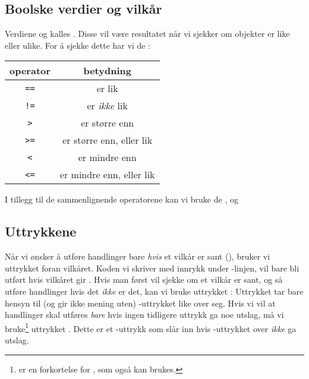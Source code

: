 \subsection{Boolske verdier og vilkår}
Verdiene  og  kalles . Disse vil være resultatet når vi sjekker om objekter er like eller ulike. For å sjekke dette har vi de :
\begin{center}
	\begin{tabular}{c|c}
		\textbf{operator} & \textbf{betydning} \\ \hline
		\texttt{==}	& er lik \\ \rowcolor{gray!10}
		\texttt{!=} & er \textsl{ikke} lik\\
		\texttt{>} & er større enn \\ \rowcolor{gray!10}
		\texttt{>=} & er større enn, eller lik \\
		\texttt{<} & er mindre enn \\ \rowcolor{gray!10}
		\texttt{<=} & er mindre enn, eller lik \\		
	\end{tabular}
\end{center}
\vsk

I tillegg til de sammenlignende operatorene kan vi bruke de  ,  og 
\subsection{Uttrykkene }
Når vi ønsker å utføre handlinger bare \textsl{hvis} et vilkår er sant (), bruker vi uttrykket  foran vilkåret. Koden vi skriver med innrykk under -linjen, vil bare bli utført hvis vilkåret gir . 
Hvis man først vil sjekke om et vilkår er sant, og så utføre handlinger hvis det \textsl{ikke} er det, kan vi bruke uttrykket :
Uttrykket  tar bare hensyn til (og gir ikke mening uten) -uttrykket like over seg. Hvis vi vil at handlinger skal utføres \textsl{bare} hvis ingen tidligere  uttrykk ga noe utslag, må vi bruke\footnote{ er en forkortelse for , som også kan brukes.} uttrykket . Dette er et -uttrykk som slår inn hvis -uttrykket over \textsl{ikke} ga utslag.
\newpage
